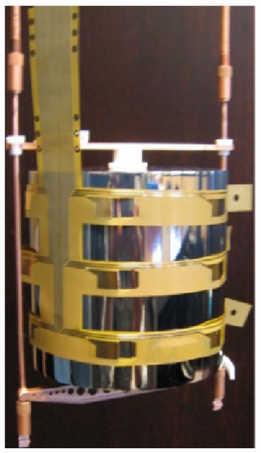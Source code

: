 \begin{figure}[tbhp]
{\includegraphics[height=0.23\textheight]{detectorHolderII}}\hfil%
\subfloat[]{\label{fig:array2}
}
\end{figure}
